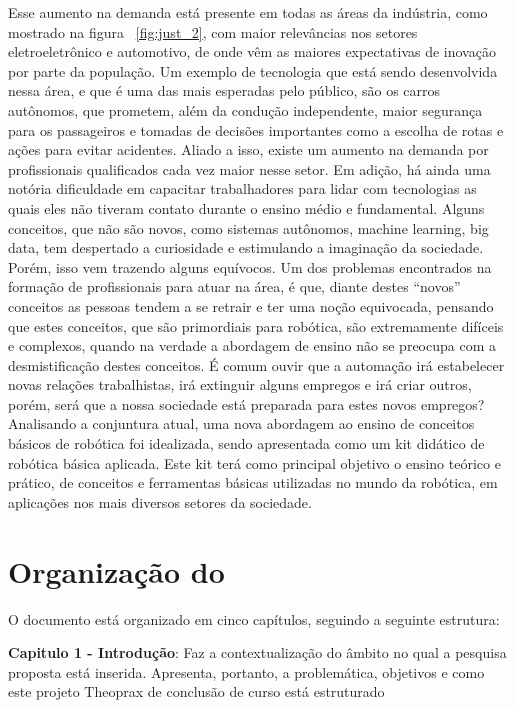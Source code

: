 Esse aumento na demanda está presente em todas as áreas da indústria, como mostrado na figura ~\ref{fig:just_2}, com maior relevâncias nos setores eletroeletrônico e automotivo, de onde vêm as maiores expectativas de inovação por parte da população. Um exemplo de tecnologia que está sendo desenvolvida nessa área, e que é uma das mais esperadas pelo público, são os carros autônomos, que prometem, além da condução independente, maior segurança para os passageiros e tomadas de decisões importantes como a escolha de rotas e ações para evitar acidentes.
Aliado a isso, existe um aumento na demanda por profissionais qualificados cada vez maior nesse setor. Em adição, há ainda uma notória dificuldade em capacitar trabalhadores para lidar com tecnologias as quais eles não tiveram contato durante o ensino médio e fundamental. Alguns conceitos, que não são novos, como sistemas autônomos, machine learning, big data, tem despertado a curiosidade e estimulando a imaginação da sociedade. Porém, isso vem trazendo alguns equívocos.
Um dos problemas encontrados na formação de profissionais para atuar na área, é que, diante destes “novos” conceitos as pessoas tendem a se retrair e ter uma noção equivocada, pensando que estes conceitos, que são primordiais para robótica, são extremamente difíceis e complexos, quando na verdade a abordagem de ensino não se preocupa com a desmistificação destes conceitos.
É comum ouvir que a automação irá estabelecer novas relações trabalhistas, irá extinguir alguns empregos e irá criar outros, porém, será que a nossa sociedade está preparada para estes novos empregos? 
Analisando a conjuntura atual, uma nova abordagem ao ensino de conceitos básicos de robótica foi idealizada, sendo apresentada como um kit didático de robótica básica aplicada. Este kit terá como principal objetivo o ensino teórico e prático, de conceitos e ferramentas básicas utilizadas no mundo da robótica, em aplicações nos mais diversos setores da sociedade. 


\section{Organização do \thetypework}
\label{section:organizacao}
O documento está organizado em cinco capítulos, seguindo a seguinte estrutura:

\textbf{Capitulo 1 - Introdução}: Faz a contextualização do âmbito no qual a pesquisa proposta
está inserida. Apresenta, portanto, a problemática, objetivos e como este projeto Theoprax de conclusão de curso está estruturado


